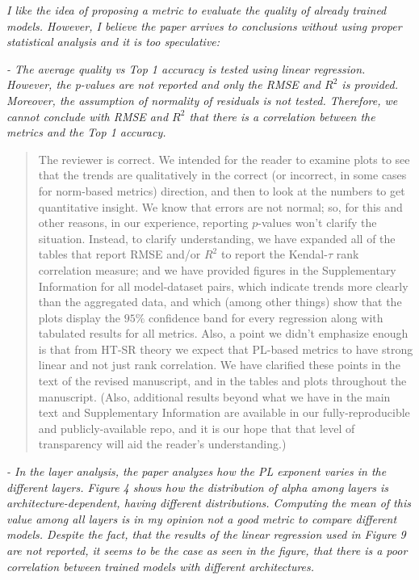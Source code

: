 \documentclass[11pt]{article}
\begin{document}
\noindent
\emph{%
I like the idea of proposing a metric to evaluate the quality of already trained models. 
However, I believe the paper arrives to conclusions without using proper statistical analysis and it is too speculative:
}

\noindent
\emph{%
- The average quality vs Top 1 accuracy is tested using linear regression. However, the p-values are not reported and only the RMSE and $R^2$ is provided. Moreover, the assumption of normality of residuals is not tested. Therefore, we cannot conclude with RMSE and $R^2$ that there is a correlation between the metrics and the Top 1 accuracy.
}

\begin{quote}
The reviewer is correct.  
We intended for the reader to examine plots to see that the trends are qualitatively in the correct (or incorrect, in some cases for norm-based metrics) direction, and then to look at the numbers to get quantitative insight.
We know that errors are not normal; so, for this and other reasons, in our experience, reporting $p$-values won't clarify the situation.
Instead, to clarify understanding, we have expanded all of the tables that report RMSE and/or $R^2$ to report the Kendal-$\tau$ rank correlation measure; and we have provided figures in the Supplementary Information for all model-dataset pairs, which indicate trends more clearly than the aggregated data, and which (among other things) show that the plots display the $95\%$ confidence band for every regression along with tabulated results for all metrics.
Also, a point we didn't emphasize enough is that from HT-SR theory we expect that PL-based metrics to have strong linear and not just rank correlation.
We have clarified these points 
in the text 
of the revised manuscript, and in the tables and plots throughout the manuscript.
(Also, additional results beyond what we have in the main text and Supplementary Information are available in our fully-reproducible and publicly-available repo, and it is our hope that that level of transparency will aid the reader's understanding.)
\end{quote}

\noindent
\emph{%
- In the layer analysis, the paper analyzes how the PL exponent varies in the different layers. Figure 4 shows how the distribution of alpha among layers is architecture-dependent, having different distributions. Computing the mean of this value among all layers is in my opinion not a good metric to compare different models. Despite the fact, that the results of the linear regression used in Figure 9 are not reported, it seems to be the case as seen in the figure, that there is a poor correlation between trained models with different architectures.
}
\end{document}
